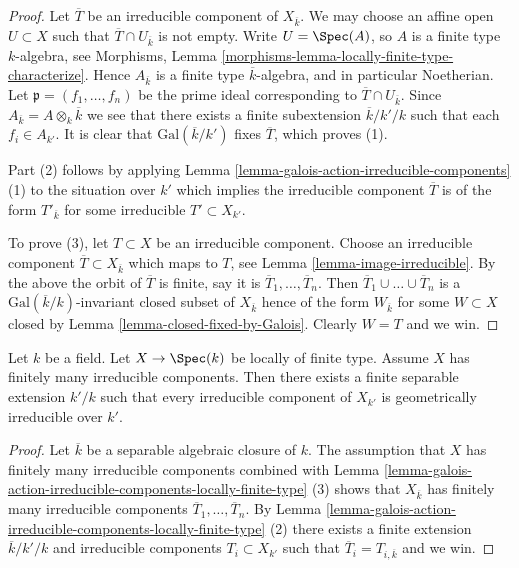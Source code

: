 \begin{proof}
Let $\overline{T}$ be an irreducible component of $X_{\overline{k}}$.
We may choose an affine open $U \subset X$ such that
$\overline{T} \cap U_{\overline{k}}$ is not empty.
Write $U = \Spec(A)$, so $A$ is a finite type $k$-algebra, see
Morphisms, Lemma \ref{morphisms-lemma-locally-finite-type-characterize}.
Hence $A_{\overline{k}}$ is a finite type $\overline{k}$-algebra,
and in particular Noetherian. Let $\mathfrak p = (f_1, \ldots, f_n)$
be the prime ideal corresponding to $\overline{T} \cap U_{\overline{k}}$.
Since $A_{\overline{k}} = A \otimes_k \overline{k}$
we see that there exists a finite subextension
$\overline{k}/k'/k$ such that each $f_i \in A_{k'}$.
It is clear that $\text{Gal}(\overline{k}/k')$
fixes $\overline{T}$, which proves (1).

\medskip\noindent
Part (2) follows by applying
Lemma \ref{lemma-galois-action-irreducible-components} (1)
to the situation over $k'$ which implies the irreducible component
$\overline{T}$ is of the form $T'_{\overline{k}}$ for some irreducible
$T' \subset X_{k'}$.

\medskip\noindent
To prove (3), let $T \subset X$ be an irreducible component.
Choose an irreducible component $\overline{T} \subset X_{\overline{k}}$
which maps to $T$, see
Lemma \ref{lemma-image-irreducible}.
By the above the orbit of $\overline{T}$ is finite, say it is
$\overline{T}_1, \ldots, \overline{T}_n$. Then
$\overline{T}_1 \cup \ldots \cup \overline{T}_n$
is a $\text{Gal}(\overline{k}/k)$-invariant closed subset of $X_{\overline{k}}$
hence of the form $W_{\overline{k}}$ for some $W \subset X$ closed by
Lemma \ref{lemma-closed-fixed-by-Galois}.
Clearly $W = T$ and we win.
\end{proof}

\begin{lemma}
\label{lemma-finite-extension-geometrically-irreducible-components}
Let $k$ be a field.
Let $X \to \Spec(k)$ be locally of finite type.
Assume $X$ has finitely many irreducible components.
Then there exists a finite separable extension $k'/k$
such that every irreducible component of $X_{k'}$
is geometrically irreducible over $k'$.
\end{lemma}

\begin{proof}
Let $\overline{k}$ be a separable algebraic closure of $k$.
The assumption that $X$ has finitely many irreducible components
combined with
Lemma \ref{lemma-galois-action-irreducible-components-locally-finite-type} (3)
shows that $X_{\overline{k}}$ has finitely many irreducible components
$\overline{T}_1, \ldots, \overline{T}_n$. By
Lemma \ref{lemma-galois-action-irreducible-components-locally-finite-type} (2)
there exists a finite extension $\overline{k}/k'/k$ and
irreducible components $T_i \subset X_{k'}$ such that
$\overline{T}_i = T_{i, \overline{k}}$ and we win.
\end{proof}

